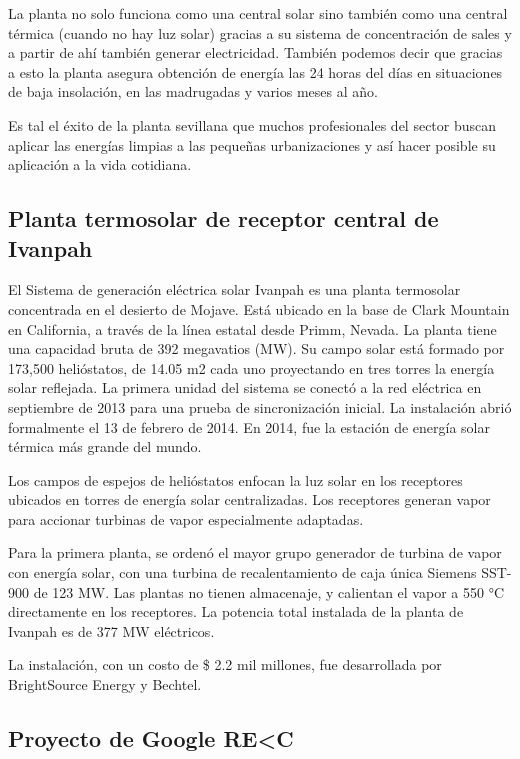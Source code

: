 La planta no solo funciona como una central solar sino también como una central térmica (cuando no hay luz solar) gracias a su sistema de concentración de sales y a partir de ahí también generar electricidad. También podemos decir que gracias a esto la planta asegura obtención de energía las 24 horas del días en situaciones de baja insolación, en las madrugadas y varios meses al año.

Es tal el éxito de la planta sevillana que muchos profesionales del sector buscan aplicar las energías limpias a las pequeñas urbanizaciones y así hacer posible su aplicación a la vida cotidiana. \cite{PonsWebSite}



\subsection{Planta termosolar de receptor central de Ivanpah}

El Sistema de generación eléctrica solar Ivanpah es una planta termosolar concentrada en el desierto de Mojave. Está ubicado en la base de Clark Mountain en California, a través de la línea estatal desde Primm, Nevada. La planta tiene una capacidad bruta de 392 megavatios (MW). Su campo solar está formado por 173,500 helióstatos, de 14.05 m2 cada uno proyectando en tres torres la energía solar reflejada. La primera unidad del sistema se conectó a la red eléctrica en septiembre de 2013 para una prueba de sincronización inicial. La instalación abrió formalmente el 13 de febrero de 2014. En 2014, fue la estación de energía solar térmica más grande del mundo.
 
Los campos de espejos de helióstatos enfocan la luz solar en los receptores ubicados en torres de energía solar centralizadas. Los receptores generan vapor para accionar turbinas de vapor especialmente adaptadas.
 
Para la primera planta, se ordenó el mayor grupo generador de turbina de vapor con energía solar, con una turbina de recalentamiento de caja única Siemens SST-900 de 123 MW. Las plantas no tienen almacenaje, y calientan el vapor a 550 °C directamente en los receptores. La potencia total instalada de la planta de Ivanpah es de 377 MW eléctricos.
 
La instalación, con un costo de \$ 2.2 mil millones, fue desarrollada por BrightSource Energy y Bechtel. \cite{Wikipedia2WebSite}



\subsection{Proyecto de Google RE\textless C}

